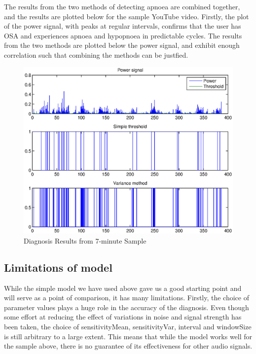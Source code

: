 The results from the two methods of detecting apnoea are combined together, and the results are plotted below for the sample YouTube video. Firstly, the plot of the power signal, with peaks at regular intervals, confirms that the user has OSA and experiences apnoea and hypopnoea in predictable cycles. The results from the two methods are plotted below the power signal, and exhibit enough correlation such that combining the methods can be justfied. 

\begin{figure}[htb]
\centering
\includegraphics[width=1\textwidth]{drawings/simpleResults}
\caption{Diagnosis Results from 7-minute Sample}
\label{fig:simpleResults}
\end{figure}

\subsection{Limitations of model}

While the simple model we have used above gave us a good starting point and will serve as a point of comparison, it has many limitations. Firstly, the choice of parameter values plays a huge role in the accuracy of the diagnosis. Even though some effort at reducing the effect of variations in noise and signal strength has been taken, the choice of sensitivityMean, sensitivityVar, interval and windowSize is still arbitrary to a large extent. This means that while the model works well for the sample above, there is no guarantee of its effectiveness for other audio signals.

